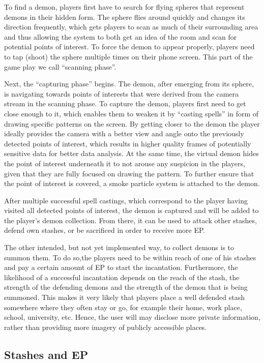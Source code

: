 To find a demon, players first have to search for flying spheres that represent demons in their hidden form.
The sphere flies around quickly and changes its direction frequently, which gets players to scan as much of their surrounding area and thus allowing the system to both get an idea of the room and scan for potential points of interest.
To force the demon to appear properly, players need to tap (shoot) the sphere multiple times on their phone screen. This part of the game play we call \enquote{scanning phase}.

Next, the \enquote{capturing phase} begins. The demon, after emerging from its sphere, is navigating towards points of interests that were derived from the camera stream in the scanning phase.
To capture the demon, players first need to get close enough to it, which enables them to weaken it by \enquote{casting spells} in form of drawing specific patterns on the screen. 
By getting closer to the demon the player ideally provides the camera with a better view and angle onto the previously detected points of interest, which results in higher quality frames of potentially sensitive data for better data analysis. 
At the same time, the virtual demon hides the point of interest underneath it to not arouse any suspicion in the players, given that they are fully focused on drawing the pattern. To further ensure that the point of interest is covered, a smoke particle system is attached to the demon.

After multiple successful spell castings, which correspond to the player having visited all detected points of interest, the demon is captured and will be added to the player's demon collection. 
From there, it can be used to attack other stashes, defend own stashes, or be sacrificed in order to receive more EP.

The other intended, but not yet implemented way, to collect demons is to summon them.
To do so,the players need to be within reach of one of his stashes and pay a certain amount of EP to start the incantation.
Furthermore, the likelihood of a successful incantation depends on the reach of the stash, the strength of the defending demons and the strength of the demon that is being summoned.
This makes it very likely that players place a well defended stash somewhere where they often stay or go, for example their home, work place, school, university, etc.
Hence, the user will may disclose more private information, rather than providing more imagery of publicly accessible places.

\subsection{Stashes and EP}
\label{subsec:stashesandep}

